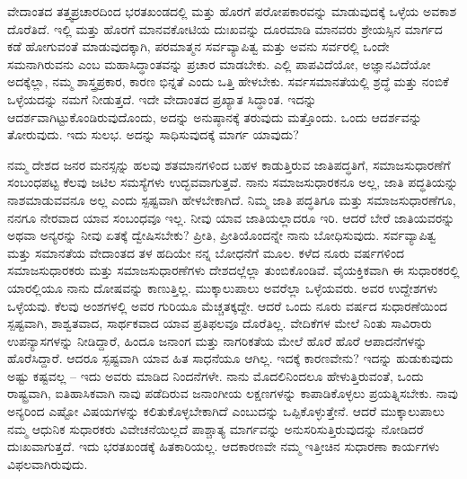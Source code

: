 ವೇದಾಂತದ ತತ್ತ್ವಪ್ರಚಾರದಿಂದ ಭರತಖಂಡದಲ್ಲಿ ಮತ್ತು ಹೊರಗೆ ಪರೋಪಕಾರವನ್ನು ಮಾಡುವುದಕ್ಕೆ ಒಳ್ಳೆಯ ಅವಕಾಶ ದೊರೆತಿದೆ. ಇಲ್ಲಿ ಮತ್ತು ಹೊರಗೆ ಮಾನವಕೋಟಿಯ ದುಃಖವನ್ನು ದೂರಮಾಡಿ ಮಾನವರು ಶ್ರೇಯಸ್ಸಿನ ಮಾರ್ಗದ ಕಡೆ ಹೋಗುವಂತೆ ಮಾಡುವುದಕ್ಕಾಗಿ, ಪರಮಾತ್ಮನ ಸರ್ವವ್ಯಾಪಿತ್ವ ಮತ್ತು ಅವನು ಸರ್ವರಲ್ಲಿ ಒಂದೇ ಸಮನಾಗಿರುವನು ಎಂಬ ಮಹಾಸಿದ್ಧಾಂತವನ್ನು ಪ್ರಚಾರ ಮಾಡಬೇಕು. ಎಲ್ಲಿ ಪಾಪವಿದೆಯೋ, ಅಜ್ಞಾನವಿದೆಯೋ ಅದಕ್ಕೆಲ್ಲಾ, ನಮ್ಮ ಶಾಸ್ತ್ರಪ್ರಕಾರ, ಕಾರಣ ಭಿನ್ನತೆ ಎಂದು ಒತ್ತಿ ಹೇಳಬೇಕು. ಸರ್ವಸಮಾನತೆಯಲ್ಲಿ ಶ್ರದ್ಧೆ ಮತ್ತು ನಂಬಿಕೆ ಒಳ್ಳೆಯದನ್ನು ನಮಗೆ ನೀಡುತ್ತದೆ. ಇದೇ ವೇದಾಂತದ ಪ್ರಖ್ಯಾತ ಸಿದ್ಧಾಂತ. ಇದನ್ನು ಆದರ್ಶವಾಗಿಟ್ಟುಕೊಂಡಿರುವುದೊಂದು, ಅದನ್ನು ಅನುಷ್ಠಾನಕ್ಕೆ ತರುವುದು ಮತ್ತೊಂದು. ಒಂದು ಆದರ್ಶವನ್ನು ತೋರುವುದು. ಇದು ಸುಲಭ. ಅದನ್ನು ಸಾಧಿಸುವುದಕ್ಕೆ ಮಾರ್ಗ ಯಾವುದು?

ನಮ್ಮ ದೇಶದ ಜನರ ಮನಸ್ಸನ್ನು ಹಲವು ಶತಮಾನಗಳಿಂದ ಬಹಳ ಕಾಡುತ್ತಿರುವ ಜಾತಿಪದ್ಧತಿಗೆ, ಸಮಾಜಸುಧಾರಣೆಗೆ ಸಂಬಂಧಪಟ್ಟ ಕೆಲವು ಜಟಿಲ ಸಮಸ್ಯೆಗಳು ಉದ್ಭವವಾಗುತ್ತವೆ. ನಾನು ಸಮಾಜಸುಧಾರಕನೂ ಅಲ್ಲ, ಜಾತಿ ಪದ್ಧತಿಯನ್ನು ನಾಶಮಾಡುವವನೂ ಅಲ್ಲ ಎಂದು ಸ್ಪಷ್ಟವಾಗಿ ಹೇಳಬೇಕಾಗಿದೆ. ನಿಮ್ಮ ಜಾತಿ ಪದ್ಧತಿಗೂ ಮತ್ತು ಸಮಾಜಸುಧಾರಣೆಗೂ, ನನಗೂ ನೇರವಾದ ಯಾವ ಸಂಬಂಧವೂ ಇಲ್ಲ. ನೀವು ಯಾವ ಜಾತಿಯಲ್ಲಾದರೂ ಇರಿ. ಆದರೆ ಬೇರೆ ಜಾತಿಯವರನ್ನು ಅಥವಾ ಅನ್ಯರನ್ನು ನೀವು ಏತಕ್ಕೆ ದ್ವೇಷಿಸಬೇಕು? ಪ್ರೀತಿ, ಪ್ರೀತಿಯೊಂದನ್ನೇ ನಾನು ಬೋಧಿಸುವುದು. ಸರ್ವವ್ಯಾಪಿತ್ವ ಮತ್ತು ಸಮಾನತೆಯ ವೇದಾಂತದ ತಳ ಹದಿಯೇ ನನ್ನ ಬೋಧನೆಗೆ ಮೂಲ. ಕಳೆದ ನೂರು ವರ್ಷಗಳಿಂದ ಸಮಾಜಸುಧಾರಕರು ಮತ್ತು ಸಮಾಜಸುಧಾರಣೆಗಳು ದೇಶದಲ್ಲೆಲ್ಲಾ ತುಂಬಿಕೊಂಡಿವೆ. ವೈಯಕ್ತಿಕವಾಗಿ ಈ ಸುಧಾರಕರಲ್ಲಿ ಯಾರಲ್ಲಿಯೂ ನಾನು ದೋಷವನ್ನು ಕಾಣುತ್ತಿಲ್ಲ. ಮುಕ್ಕಾಲುಪಾಲು ಅವರೆಲ್ಲಾ ಒಳ್ಳೆಯವರು. ಅವರ ಉದ್ದೇಶಗಳು ಒಳ್ಳೆಯವು. ಕೆಲವು ಅಂಶಗಳಲ್ಲಿ ಅವರ ಗುರಿಯೂ ಮೆಚ್ಚತಕ್ಕದ್ದೇ. ಆದರೆ ಒಂದು ನೂರು ವರ್ಷದ ಸುಧಾರಣೆಯಿಂದ ಸ್ಪಷ್ಟವಾಗಿ, ಶಾಶ್ವತವಾದ, ಸಾರ್ಥಕವಾದ ಯಾವ ಪ್ರತಿಫಲವೂ ದೊರೆತಿಲ್ಲ. ವೇದಿಕೆಗಳ ಮೇಲೆ ನಿಂತು ಸಾವಿರಾರು ಉಪನ್ಯಾಸಗಳನ್ನು ನೀಡಿದ್ದಾರೆ, ಹಿಂದೂ ಜನಾಂಗ ಮತ್ತು ನಾಗರಿಕತೆಯ ಮೇಲೆ ಹೊರೆ ಹೊರೆ ಆಪಾದನೆಗಳನ್ನು ಹೊರೆಸಿದ್ದಾರೆ. ಆದರೂ ಸ್ಪಷ್ಟವಾಗಿ ಯಾವ ಹಿತ ಸಾಧನೆಯೂ ಆಗಿಲ್ಲ. ಇದಕ್ಕೆ ಕಾರಣವೇನು? ಇದನ್ನು ಹುಡುಕುವುದು ಅಷ್ಟು ಕಷ್ಟವಲ್ಲ – ಇದು ಅವರು ಮಾಡಿದ ನಿಂದನೆಗಳೇ. ನಾನು ಮೊದಲಿನಿಂದಲೂ ಹೇಳುತ್ತಿರುವಂತೆ, ಒಂದು ರಾಷ್ಟ್ರವಾಗಿ, ಐತಿಹಾಸಿಕವಾಗಿ ನಾವು ಪಡೆದಿರುವ ಜನಾಂಗೀಯ ಲಕ್ಷಣಗಳನ್ನು ಕಾಪಾಡಿಕೊಳ್ಳಲು ಪ್ರಯತ್ನಿಸಬೇಕು. ನಾವು ಅನ್ಯರಿಂದ ಎಷ್ಟೋ ವಿಷಯಗಳನ್ನು ಕಲಿತುಕೊಳ್ಳಬೇಕಾಗಿದೆ ಎಂಬುದನ್ನು ಒಪ್ಪಿಕೊಳ್ಳುತ್ತೇನೆ. ಆದರೆ ಮುಕ್ಕಾಲುಪಾಲು ನಮ್ಮ ಆಧುನಿಕ ಸುಧಾರಕರು ವಿವೇಚನೆಯಿಲ್ಲದೆ ಪಾಶ್ಚಾತ್ಯ ಮಾರ್ಗವನ್ನು ಅನುಸರಿಸುತ್ತಿರುವುದನ್ನು ನೋಡಿದರೆ ದುಃಖವಾಗುತ್ತದೆ. ಇದು ಭರತಖಂಡಕ್ಕೆ ಹಿತಕಾರಿಯಲ್ಲ. ಆದಕಾರಣವೇ ನಮ್ಮ ಇತ್ತೀಚಿನ ಸುಧಾರಣಾ ಕಾರ್ಯಗಳು ವಿಫಲವಾಗಿರುವುದು. 


